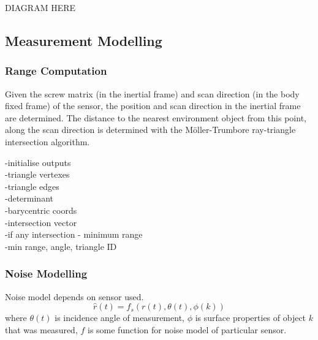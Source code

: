 DIAGRAM HERE

\subsection{Measurement Modelling}
	\subsubsection{Range Computation}
	Given the screw matrix (in the inertial frame) and scan direction (in the body fixed frame) of the sensor, the position and scan direction in the inertial frame are determined.
	The distance to the nearest environment object from this point, along the scan direction is determined with the M{\"o}ller-Trumbore ray-triangle intersection algorithm.

	\begin{algorithm}[H]
	\SetAlgoLined
	
	-initialise outputs\\
	-triangle vertexes\\
	-triangle edges\\
	-determinant\\
	-barycentric coords\\
	-intersection vector\\
	-if any intersection - minimum range\\
		-min range, angle, triangle ID
	
	\caption{M{\"o}ller-Trumbore ray-triangle intersection algorithm}
	\end{algorithm}

	\subsubsection{Noise Modelling}
	Noise model depends on sensor used.
	\begin{equation}
		\hat{r}(t) = f_s(r(t),\theta(t),\phi(k))
	\end{equation}
	where $\theta(t)$ is incidence angle of measurement, $\phi$ is surface properties of object $k$ that was measured, $f$ is some function for noise model of particular sensor.
	
